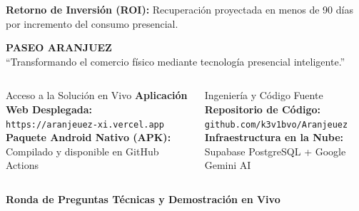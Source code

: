 \documentclass[aspectratio=169, 10pt]{beamer}
\begin{document}
\begin{frame}
  \vskip 0.35cm
  \centering \footnotesize \color{AranjuezText}
  \textbf{Retorno de Inversión (ROI):} Recuperación proyectada en menos de 90 días por incremento del consumo presencial.
\end{frame}

\begin{frame}[plain]

  \begin{center}
    \vspace{0.6cm}
    {\Huge \textbf{\color{AranjuezGold}PASEO ARANJUEZ}} \\
    \vskip 0.15cm
    {\large \color{white}``Transformando el comercio físico mediante tecnología presencial inteligente.''}
    \vskip 0.6cm

    \begin{columns}[c]
      \begin{column}{0.4\textwidth}
        \begin{block}{Acceso a la Solución en Vivo}
          \centering \scriptsize
          \textbf{Aplicación Web Desplegada:} \\
          \texttt{https://aranjeuez-xi.vercel.app} \\
          \vskip 0.15cm
          \textbf{Paquete Android Nativo (APK):} \\
          Compilado y disponible en GitHub Actions
        \end{block}
      \end{column}

      \begin{column}{0.4\textwidth}
        \begin{exampleblock}{Ingeniería y Código Fuente}
          \centering \scriptsize
          \textbf{Repositorio de Código:} \\
          \texttt{github.com/k3v1bvo/Aranjeuez} \\
          \vskip 0.15cm
          \textbf{Infraestructura en la Nube:} \\
          Supabase PostgreSQL + Google Gemini AI
        \end{exampleblock}
      \end{column}
    \end{columns}

    \vskip 0.6cm
    {\large \color{AranjuezOrange} \textbf{Ronda de Preguntas Técnicas y Demostración en Vivo}}
  \end{center}
\end{frame}
\end{document}
